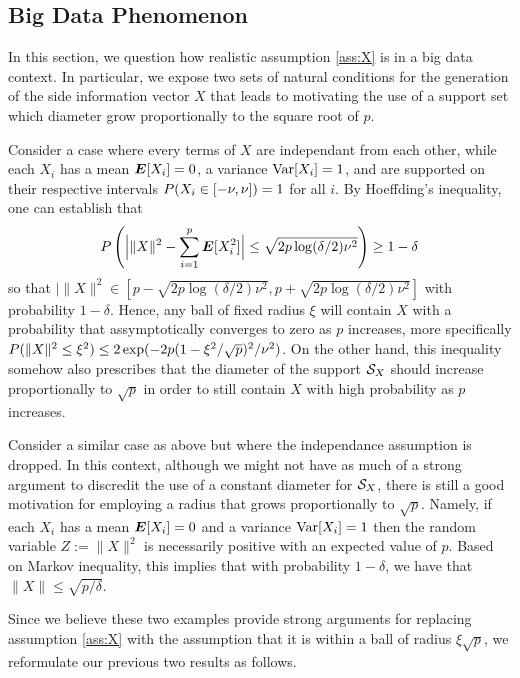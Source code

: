 \subsection{Big Data Phenomenon}\label{sec:bigdata}

In this section, we question how realistic assumption \ref{ass:X} is in a big data
context. In particular, we expose two sets of natural conditions for the generation of the
side information vector $X$ that leads to motivating the use of a support set which
diameter grow proportionally to the square root of $p$.

\begin{ex}
  Consider a case where every terms of $X$ are independant from each other, while each
  $X_i$ has a mean $\bm E[X_i]=0$, a variance $\operatorname{Var}[X_i]=1$, and are supported on their
  respective intervals $P(X_i\in [-\nu, \nu])=1$ for all $i$. By Hoeffding's
  inequality, one can establish that
  \[
    P\left(\Bigl|\|X\|^2 - \sum_{i=1}^p \bm E[X_i^2]\Bigr| \leq
      \sqrt{2p\log(\delta/2)\nu^2}\right) \geq 1-\delta
  \]
  so that $|\|X\|^2 \in [p- \sqrt{2p\log(\delta/2)\nu^2}, p+ \sqrt{2p\log(\delta/2)\nu^2}]$
  with probability $1-\delta$. Hence, any ball of fixed radius $\xi$ will contain $X$ with
  a probability that assymptotically converges to zero as $p$ increases, more specifically
  $P(\|X\|^2\leq \xi^2)\leq 2\exp(-2p(1-\xi^2/\sqrt{p})^2/\nu^2)$. On the other hand,
  this inequality somehow also prescribes that the diameter of the support ${\mathcal{S}_X}$ should
  increase proportionally to $\sqrt{p}$ in order to still contain $X$ with high
  probability as $p$ increases.
\end{ex}

\begin{ex}
  Consider a similar case as above but where the independance assumption is dropped. In
  this context, although we might not have as much of a strong argument to discredit the
  use of a constant diameter for ${\mathcal{S}_X}$, there is still a good motivation for employing a
  radius that grows proportionally to $\sqrt{p}$. Namely, if each $X_i$ has a mean
  $\bm E[X_i]=0$ and a variance $\operatorname{Var}[X_i]=1$ then the random variable $Z:=\|X\|^2$ is
  necessarily positive with an expected value of $p$. Based on Markov inequality, this
  implies that with probability $1-\delta$, we have that $\|X\|\leq \sqrt{p/\delta}$.
\end{ex}

Since we believe these two examples provide strong arguments for replacing assumption
\ref{ass:X} with the assumption that it is within a ball of radius $\xi\sqrt{p}$, we
reformulate our previous two results as follows.

